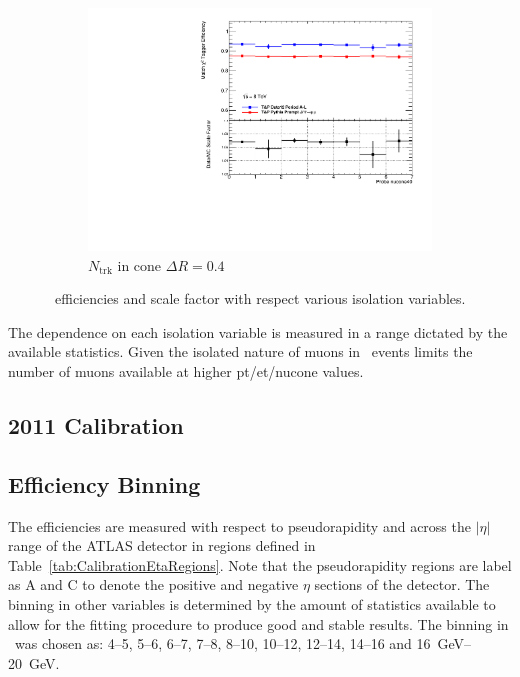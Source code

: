 \begin{figure}[phtb]
    \begin{subfigure}[b]{0.55\textwidth}
      \includegraphics[width=\textwidth]{PartCalibration2012/Plots/SFPlots/nucone40_smt.pdf}
      \caption{$N_{\textrm{trk}}$ in cone $\Delta R=0.4$} \label{fig:CalibrationIsoNucone40}
    \end{subfigure}
  \caption{\xsd\ efficiencies and scale factor with respect various isolation variables.} \label{fig:CalibrationIsoNucone}
\end{figure}

The dependence on each isolation variable is measured in a range dictated by the available statistics. Given the isolated nature of muons in \jpsi\ events limits the number of muons available at higher pt/et/nucone values.

\subsection{2011 Calibration}


\subsection{Efficiency Binning}
The efficiencies are measured with respect to pseudorapidity and across the $|\eta|$ range of the ATLAS detector in regions defined in Table~\ref{tab:CalibrationEtaRegions}. Note that the pseudorapidity regions are label as A and C to denote the positive and negative $\eta$ sections of the detector. The binning in other variables is determined by the amount of statistics available to allow for the fitting procedure to produce good and stable results. The binning in \pt\ was chosen as: \numrange{4}{5}, \numrange{5}{6}, \numrange{6}{7}, \numrange{7}{8}, \numrange{8}{10}, \numrange{10}{12}, \numrange{12}{14}, \numrange{14}{16} and \SIrange[range-units=single]{16}{20}{\GeV}.  

